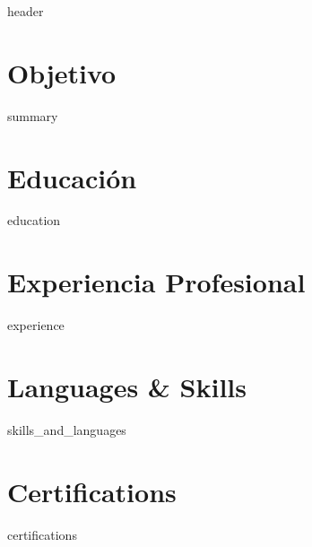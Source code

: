 \documentclass[10pt, letterpaper]{article}
\begin{document}
{{ header }}


\section*{Objetivo}
{{ summary }}


\section*{Educación}
{{ education }}


\section*{Experiencia Profesional}
{{ experience }}


\section*{Languages \& Skills}
{{ skills_and_languages }}


\section*{Certifications}
{{ certifications }}
\end{document}
